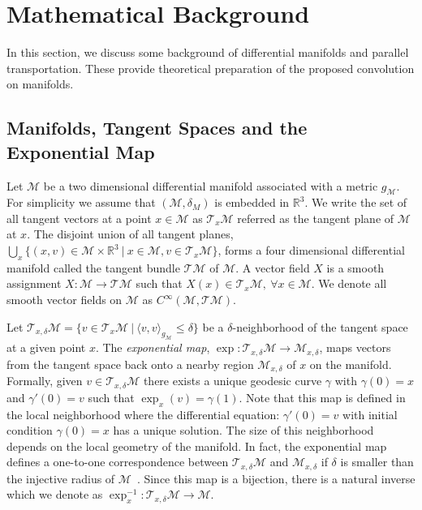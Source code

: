 \documentclass[10pt,twocolumn,letterpaper]{article}
\def\M{\mathcal{M}}
\def\T{\mathcal{T}}
\def\RR{\mathbb{R}}
\begin{document}
\section{Mathematical Background}
\label{sec:Math}
In this section, we discuss some background of differential manifolds and parallel transportation. These provide theoretical preparation of the proposed convolution on manifolds.

\subsection{Manifolds, Tangent Spaces and the Exponential Map}

Let $\M$ be a two dimensional differential manifold associated with a metric $g_{\M}$. For simplicity we assume that $(\M,\delta_M)$ is embedded in $\RR^3$. We write the set of all tangent vectors at a point $x\in\M$ as $\T_x\M$ referred as the tangent plane of $\M$ at $x$. The disjoint union of all tangent planes, $\bigcup_{x} \{(x,v)\in\M\times \RR^3~|~x\in\M, v\in\T_x\M\}$, forms a four dimensional differential manifold called the tangent bundle $\T\M$ of $\M$. A vector field $X$ is a smooth assignment $X: \M\rightarrow\T\M$ such that $X(x)\in\T_x\M, ~\forall x\in\M$. We denote all smooth vector fields on $\M$ as $C^{\infty}(\M, \T \M)$.

Let $\T_{x,\delta} \M = \{v\in \T_{x}\M ~|~ \langle v,v\rangle_{g_{\M}} \leq \delta\}$ be a $\delta$-neighborhood of the tangent space at a given point $x$. The {\it exponential map}, $\exp: \T_{x,\delta} \M \rightarrow \M_{x,\delta}$, maps vectors from the tangent space back onto a nearby region $\M_{x,\delta}$ of $x$ on the manifold. Formally, given $v\in \T_{x,\delta}\M$ there exists a unique geodesic curve $\gamma$ with $\gamma(0)= x$ and $\gamma'(0) = v$ such that $\exp_{x}(v) = \gamma(1)$.
Note that this map is defined in the local neighborhood where the differential equation: $\gamma'(0) = v$ with initial condition $\gamma(0) = x$ has a unique solution. The size of this neighborhood depends on the local geometry of the manifold. In fact,  the exponential map defines a one-to-one correspondence between $\T_{x,\delta}\M$ and $\M_{x,\delta}$ if $\delta$ is smaller than the injective radius of $\M$~\cite{kobayashi1969foundations,chavel2006riemannian}. Since this map is a bijection, there is a natural inverse which we denote as $\exp_{x}^{-1}: \T_{x,\delta} \M \rightarrow \M$.
\end{document}
